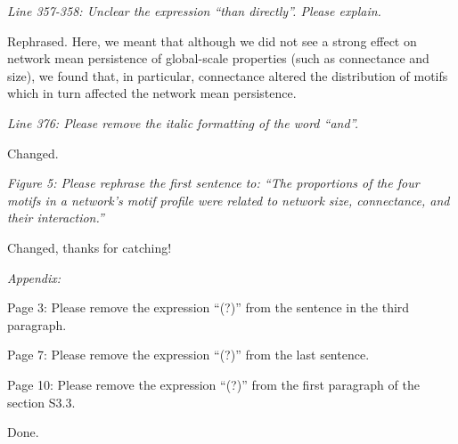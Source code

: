 \documentclass[12pt]{article}
\newcommand{\us}{\rm \setlength{\leftskip}{0.3cm} \setlength{\rightskip}{0.3cm}}
\newcommand{\them}{\it \setlength{\leftskip}{0cm} \setlength{\rightskip}{0cm}}
\begin{document}
        \them
        Line 357-358: Unclear the expression “than directly”. Please explain.
        
        \us
        Rephrased. Here, we meant that although we did not see a strong effect on network mean persistence of global-scale properties (such as connectance and size), we found that, in particular, connectance altered the distribution of motifs which in turn affected the network mean persistence.  
        
        \them
        Line 376: Please remove the italic formatting of the word “and”.
        
        \us
        Changed.
        
        \them
        Figure 5: Please rephrase the first sentence to: “The proportions of the four motifs in a network's motif profile were related to network size, connectance, and their interaction.”
        
        \us
        Changed, thanks for catching!
        
        \them
        Appendix:
        
        Page 3: Please remove the expression “(?)” from the sentence in the third paragraph.
        
        Page 7: Please remove the expression “(?)” from the last sentence.
        
        Page 10: Please remove the expression “(?)” from the first paragraph of the section S3.3.
        
        \us
        Done.

\clearpage


\end{document}
